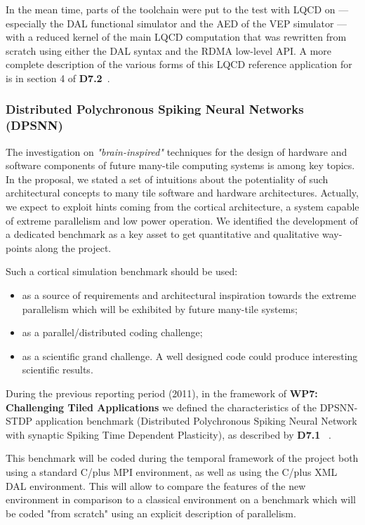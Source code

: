 In the mean time, parts of the \euretile toolchain were put to the
test with LQCD on \quong --- especially the DAL functional simulator
and the AED of the VEP simulator --- with a reduced kernel of the main
LQCD computation that was rewritten from scratch using either the DAL
syntax and the RDMA low-level API.
A more complete description of the various forms of this LQCD
reference application for \euretile is in section 4 of
\textbf{D7.2}~\cite{euretile:D7_2}.

\subsubsection{Distributed Polychronous Spiking Neural Networks (DPSNN)}
\label{sec:DPSNN}
The investigation on \textit{"brain-inspired"} techniques for the
design of hardware and software components of future many-tile
computing systems is among \euretile key topics.
In the proposal, we stated a set of intuitions about the potentiality
of such architectural concepts to many tile software and hardware
architectures. Actually, we expect to exploit hints coming from the
cortical architecture, a system capable of extreme parallelism and low
power operation.
We identified the development of a dedicated benchmark as a key asset
to get quantitative and qualitative way-points along the project.

Such a cortical simulation benchmark should be used:
\begin{itemize}
 \item as a source of requirements and architectural inspiration
towards the extreme parallelism which will be exhibited by future
many-tile systems;
 \item as a parallel/distributed coding challenge;
 \item as a scientific grand challenge. A well designed code could
produce interesting scientific results.
\end{itemize}

During the previous reporting period (2011), in the framework of
\textbf{WP7: Challenging Tiled Applications} we defined the
characteristics of the DPSNN-STDP application benchmark (Distributed
Polychronous Spiking Neural Network with synaptic Spiking Time
Dependent Plasticity), as described by \textbf{D7.1} ~\cite{euretile:D7_1}.

This benchmark will be coded during the temporal framework of the
\euretile project both using a standard C/\cpp plus MPI environment, as
well as using the C/\cpp plus XML DAL environment.
This will allow to compare the features of the new environment in
comparison to a classical environment on a benchmark which will be
coded "from scratch" using an explicit description of parallelism.

